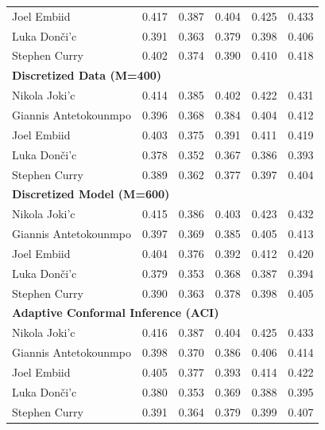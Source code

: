 \documentclass[11pt,a4paper]{article}
\begin{document}
\begin{table}[H]
\begin{tabular}{lccccc}
Joel Embiid & 0.417 & 0.387 & 0.404 & 0.425 & 0.433 \\
Luka Don\v{c}i'{c} & 0.391 & 0.363 & 0.379 & 0.398 & 0.406 \\
Stephen Curry & 0.402 & 0.374 & 0.390 & 0.410 & 0.418 \\
\midrule
\multicolumn{6}{l}{\textbf{Discretized Data (M=400)}} \\
\midrule
Nikola Joki'{c} & 0.414 & 0.385 & 0.402 & 0.422 & 0.431 \\
Giannis Antetokounmpo & 0.396 & 0.368 & 0.384 & 0.404 & 0.412 \\
Joel Embiid & 0.403 & 0.375 & 0.391 & 0.411 & 0.419 \\
Luka Don\v{c}i'{c} & 0.378 & 0.352 & 0.367 & 0.386 & 0.393 \\
Stephen Curry & 0.389 & 0.362 & 0.377 & 0.397 & 0.404 \\
\midrule
\multicolumn{6}{l}{\textbf{Discretized Model (M=600)}} \\
\midrule
Nikola Joki'{c} & 0.415 & 0.386 & 0.403 & 0.423 & 0.432 \\
Giannis Antetokounmpo & 0.397 & 0.369 & 0.385 & 0.405 & 0.413 \\
Joel Embiid & 0.404 & 0.376 & 0.392 & 0.412 & 0.420 \\
Luka Don\v{c}i'{c} & 0.379 & 0.353 & 0.368 & 0.387 & 0.394 \\
Stephen Curry & 0.390 & 0.363 & 0.378 & 0.398 & 0.405 \\
\midrule
\multicolumn{6}{l}{\textbf{Adaptive Conformal Inference (ACI)}} \\
\midrule
Nikola Joki'{c} & 0.416 & 0.387 & 0.404 & 0.425 & 0.433 \\
Giannis Antetokounmpo & 0.398 & 0.370 & 0.386 & 0.406 & 0.414 \\
Joel Embiid & 0.405 & 0.377 & 0.393 & 0.414 & 0.422 \\
Luka Don\v{c}i'{c} & 0.380 & 0.353 & 0.369 & 0.388 & 0.395 \\
Stephen Curry & 0.391 & 0.364 & 0.379 & 0.399 & 0.407 \\
\bottomrule
\end{tabular}
\end{table}
\end{document}
